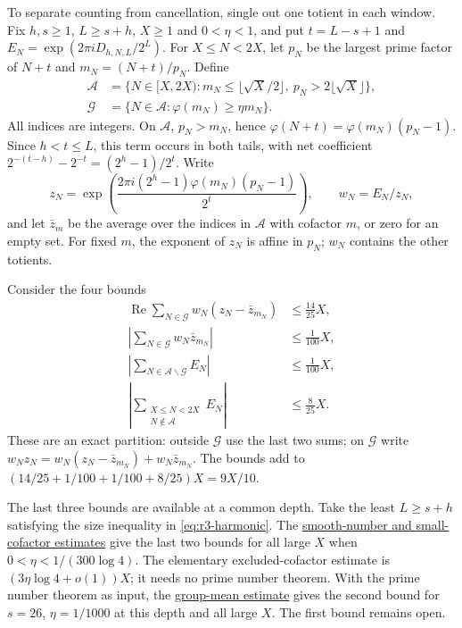 \documentclass[11pt]{article}
\newcommand{\longrecord}[2]{\href{erdos249-totient-reasoning-surface.pdf\##1}{#2}}
\begin{document}
To separate counting from cancellation, single out one totient in
each window. Fix $h,s\ge1$,
$L\ge s+h$, $X\ge1$ and $0<\eta<1$, and put
$t=L-s+1$ and $E_N=\exp(2\pi iD_{h,N,L}/2^L)$.
For $X\le N<2X$, let $p_N$ be the largest prime factor of $N+t$ and
$m_N=(N+t)/p_N$. Define
\[
\begin{aligned}
 \mathcal A&=\{N\in[X,2X):m_N\le\lfloor\sqrt X/2\rfloor,
                      \ p_N>2\lfloor\sqrt X\rfloor\},\\
 \mathcal G&=\{N\in\mathcal A:\varphi(m_N)\ge\eta m_N\}.
\end{aligned}
\]
All indices are integers. On $\mathcal A$, $p_N>m_N$, hence
$\varphi(N+t)=\varphi(m_N)(p_N-1)$. Since $h<t\le L$, this term
occurs in both tails, with net coefficient
$2^{-(t-h)}-2^{-t}=(2^h-1)/2^t$. Write
\[
 z_N=\exp\!\left(\frac{2\pi i(2^h-1)\varphi(m_N)(p_N-1)}{2^t}\right),
 \qquad w_N=E_N/z_N,
\]
and let $\bar z_m$ be the average over the indices in $\mathcal A$
with cofactor $m$, or zero for an empty set.
For fixed $m$, the exponent of $z_N$ is affine in $p_N$;
$w_N$ contains the other totients.

Consider the four bounds
\begin{equation}\label{eq:r3-four-bounds}
\begin{aligned}
 \operatorname{Re}\sum_{N\in\mathcal G}w_N(z_N-\bar z_{m_N})
       &\le\tfrac{14}{25}X,\\
 \left|\sum_{N\in\mathcal G}w_N\bar z_{m_N}\right|
       &\le\tfrac1{100}X,\\
 \left|\sum_{N\in\mathcal A\smallsetminus\mathcal G}E_N\right|
       &\le\tfrac1{100}X,\\
 \left|\sum_{\substack{X\le N<2X\\N\notin\mathcal A}}E_N\right|
       &\le\tfrac8{25}X.
\end{aligned}
\end{equation}
These are an exact partition: outside $\mathcal G$ use the last two
sums; on $\mathcal G$ write
$w_Nz_N=w_N(z_N-\bar z_{m_N})+w_N\bar z_{m_N}$.
The bounds add to $(14/25+1/100+1/100+8/25)X=9X/10$.

The last three bounds are available at a common depth. Take the least
$L\ge s+h$ satisfying the size inequality in \eqref{eq:r3-harmonic}.
The \longrecord{long249-r3-counts}{smooth-number and small-cofactor estimates}
give the last two bounds for all large $X$ when
$0<\eta<1/(300\log4)$. The elementary excluded-cofactor estimate is
$(3\eta\log4+o(1))X$; it needs no prime number theorem.
With the prime number theorem as input, the
\longrecord{long249-group-mean}{group-mean estimate} gives the second
bound for $s=26$, $\eta=1/1000$ at this depth and all large $X$.
The first bound remains open.
\end{document}
